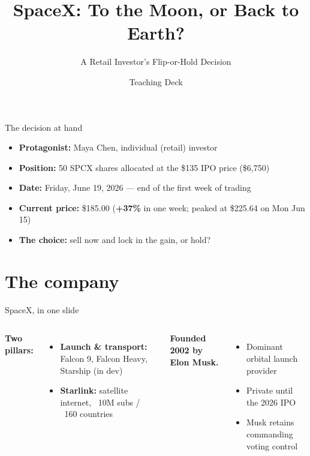 \documentclass[aspectratio=169,11pt]{beamer}
\title[SpaceX: Flip or Hold?]{SpaceX: To the Moon, or Back to Earth?}
\subtitle{A Retail Investor's Flip-or-Hold Decision}
\author{Teaching Deck}
\institute{HBS-style case \textbar{} Event date: June 19, 2026}
\date{}
\begin{document}
\maketitle

\begin{frame}{The decision at hand}
  \begin{itemize}
    \item \textbf{Protagonist:} Maya Chen, individual (retail) investor
    \item \textbf{Position:} 50 SPCX shares allocated at the \$135 IPO price (\$6,750)
    \item \textbf{Date:} Friday, June 19, 2026 --- end of the first week of trading
    \item \textbf{Current price:} \$185.00 \quad (\textbf{+37\%} in one week; peaked at \$225.64 on Mon Jun 15)
    \item \textbf{The choice:} \alert{sell now and lock in the gain, or hold?}
  \end{itemize}
\end{frame}

\section{The company}

\begin{frame}{SpaceX, in one slide}
  \begin{columns}[T,onlytextwidth]
      \textbf{Two pillars:}
      \begin{itemize}
        \item \textbf{Launch \& transport:} Falcon 9, Falcon Heavy, Starship (in dev)
        \item \textbf{Starlink:} satellite internet, ~10M subs / ~160 countries
      \end{itemize}
      \textbf{Founded 2002 by Elon Musk.}
      \begin{itemize}
        \item Dominant orbital launch provider
        \item Private until the 2026 IPO
        \item Musk retains commanding voting control
      \end{itemize}
  \end{columns}
\end{frame}
\end{document}
